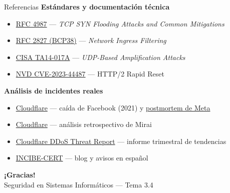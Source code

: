 \documentclass[aspectratio=169,11pt]{beamer}
\newcommand{\subt}[1]{{\color{uznavy}\bfseries #1}\par\smallskip}
\begin{document}
\begin{frame}{Referencias}
\footnotesize
\subt{Estándares y documentación técnica}
  \begin{itemize}
  \item \href{https://datatracker.ietf.org/doc/html/rfc4987}{RFC 4987} --- \emph{TCP SYN Flooding Attacks and Common Mitigations}
  \item \href{https://datatracker.ietf.org/doc/html/rfc2827}{RFC 2827 (BCP38)} --- \emph{Network Ingress Filtering}
  \item \href{https://us-cert.cisa.gov/ncas/alerts/TA14-017A}{CISA TA14-017A} --- \emph{UDP-Based Amplification Attacks}
  \item \href{https://nvd.nist.gov/vuln/detail/CVE-2023-44487}{NVD CVE-2023-44487} --- HTTP/2 Rapid Reset
  \end{itemize}
\medskip
\subt{Análisis de incidentes reales}
  \begin{itemize}
  \item \href{https://blog.cloudflare.com/october-2021-facebook-outage/}{Cloudflare} --- caída de Facebook (2021) y \href{https://engineering.fb.com/2021/10/05/networking-traffic/outage-details/}{postmortem de Meta}
  \item \href{https://blog.cloudflare.com/inside-mirai-the-infamous-iot-botnet-a-retrospective-analysis/}{Cloudflare} --- análisis retrospectivo de Mirai
  \item \href{https://blog.cloudflare.com/ddos-threat-report-2025-q3/}{Cloudflare DDoS Threat Report} --- informe trimestral de tendencias
  \item \href{https://www.incibe.es/incibe-cert/blog}{INCIBE-CERT} --- blog y avisos en español
  \end{itemize}
\end{frame}

\begin{frame}[plain]
  \begin{center}
    {\Huge\bfseries\color{uznavy} ¡Gracias!}\\[1em]
    {\large Seguridad en Sistemas Informáticos --- Tema 3.4}
  \end{center}
\end{frame}

\end{document}
